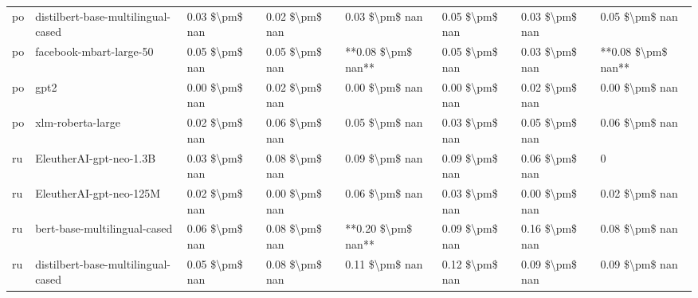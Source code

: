 \begin{tabular}{llllllll}
      po & distilbert-base-multilingual-cased & 0.03 \$\textbackslash pm\$ nan &            0.02 \$\textbackslash pm\$ nan &        0.03 \$\textbackslash pm\$ nan &         0.05 \$\textbackslash pm\$ nan &                          0.03 \$\textbackslash pm\$ nan &     0.05 \$\textbackslash pm\$ nan \\
      po &            facebook-mbart-large-50 & 0.05 \$\textbackslash pm\$ nan &            0.05 \$\textbackslash pm\$ nan &    **0.08 \$\textbackslash pm\$ nan** &         0.05 \$\textbackslash pm\$ nan &                          0.03 \$\textbackslash pm\$ nan & **0.08 \$\textbackslash pm\$ nan** \\
      po &                               gpt2 & 0.00 \$\textbackslash pm\$ nan &            0.02 \$\textbackslash pm\$ nan &        0.00 \$\textbackslash pm\$ nan &         0.00 \$\textbackslash pm\$ nan &                          0.02 \$\textbackslash pm\$ nan &     0.00 \$\textbackslash pm\$ nan \\
      po &                  xlm-roberta-large & 0.02 \$\textbackslash pm\$ nan &            0.06 \$\textbackslash pm\$ nan &        0.05 \$\textbackslash pm\$ nan &         0.03 \$\textbackslash pm\$ nan &                          0.05 \$\textbackslash pm\$ nan &     0.06 \$\textbackslash pm\$ nan \\
      ru &            EleutherAI-gpt-neo-1.3B & 0.03 \$\textbackslash pm\$ nan &            0.08 \$\textbackslash pm\$ nan &        0.09 \$\textbackslash pm\$ nan &         0.09 \$\textbackslash pm\$ nan &                          0.06 \$\textbackslash pm\$ nan &                  0 \\
      ru &            EleutherAI-gpt-neo-125M & 0.02 \$\textbackslash pm\$ nan &            0.00 \$\textbackslash pm\$ nan &        0.06 \$\textbackslash pm\$ nan &         0.03 \$\textbackslash pm\$ nan &                          0.00 \$\textbackslash pm\$ nan &     0.02 \$\textbackslash pm\$ nan \\
      ru &       bert-base-multilingual-cased & 0.06 \$\textbackslash pm\$ nan &            0.08 \$\textbackslash pm\$ nan &    **0.20 \$\textbackslash pm\$ nan** &         0.09 \$\textbackslash pm\$ nan &                          0.16 \$\textbackslash pm\$ nan &     0.08 \$\textbackslash pm\$ nan \\
      ru & distilbert-base-multilingual-cased & 0.05 \$\textbackslash pm\$ nan &            0.08 \$\textbackslash pm\$ nan &        0.11 \$\textbackslash pm\$ nan &         0.12 \$\textbackslash pm\$ nan &                          0.09 \$\textbackslash pm\$ nan &     0.09 \$\textbackslash pm\$ nan \\

\end{tabular}
